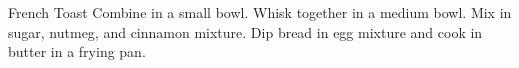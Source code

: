 \begin{recipe}{French Toast}{}{}
Combine in a small bowl.
Whisk together in a medium bowl. Mix in sugar, nutmeg, and cinnamon mixture.
\freeform Dip bread in egg mixture and cook in butter in a frying pan.
\end{recipe}
